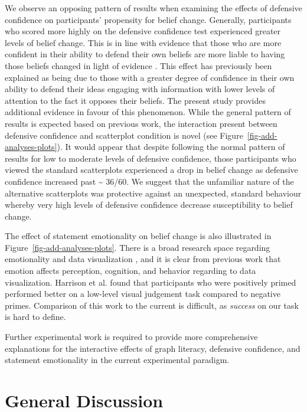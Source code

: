 \documentclass[manuscript,screen,review,anonymous]{acmart}
\begin{document}
We observe an opposing pattern of results when examining the effects of
defensive confidence on participants' propensity for belief change.
Generally, participants who scored more highly on the defensive
confidence test experienced greater levels of belief change. This is in
line with evidence that those who are more confident in their ability to
defend their own beliefs are more liable to having those beliefs changed
in light of evidence \citep{albarracin_2004}. This effect has previously
been explained as being due to those with a greater degree of confidence
in their own ability to defend their ideas engaging with information
with lower levels of attention to the fact it opposes their beliefs. The
present study provides additional evidence in favour of this phenomenon.
While the general pattern of results is expected based on previous work,
the interaction present between defensive confidence and scatterplot
condition is novel (see Figure~\ref{fig-add-analyses-plots}). It would
appear that despite following the normal pattern of results for low to
moderate levels of defensive confidence, those participants who viewed
the standard scatterplots experienced a drop in belief change as
defensive confidence increased past \textasciitilde{} 36/60. We suggest
that the unfamiliar nature of the alternative scatterplots was
protective against an unexpected, standard behaviour whereby very high
levels of defensive confidence decrease susceptibility to belief change.

The effect of statement emotionality on belief change is also
illustrated in Figure~\ref{fig-add-analyses-plots}. There is a broad
research space regarding emotionality and data visualization
\citep{lan_2023}, and it is clear from previous work that emotion
affects perception, cognition, and behavior
\citep{phelps_2006, harrison_2013, thoresen_2016} regarding to data
visualization. Harrison et al. \citep{harrison_2013} found that
participants who were positively primed performed better on a low-level
visual judgement task compared to negative primes. Comparison of this
work to the current is difficult, as \emph{success} on our task is hard
to define.

Further experimental work is required to provide more comprehensive
explanations for the interactive effects of graph literacy, defensive
confidence, and statement emotionality in the current experimental
paradigm.

\section{General Discussion}\label{sec-general-discussion}
\end{document}
